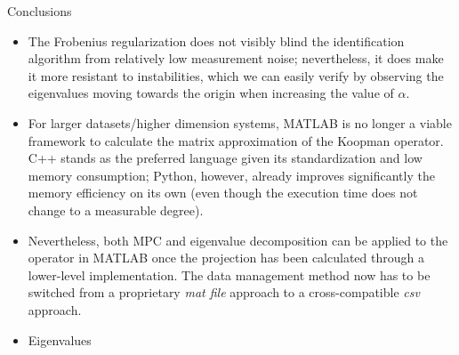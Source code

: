 \documentclass{beamer}
\begin{document}
\begin{frame}[allowframebreaks]{Conclusions}
    \begin{itemize}
        \item The Frobenius regularization does not visibly blind the identification algorithm from relatively low measurement noise; nevertheless, it does make it more resistant to instabilities, which we can easily verify by observing the eigenvalues moving towards the origin when increasing the value of $\alpha$.
        \item For larger datasets/higher dimension systems, MATLAB is no longer a viable framework to calculate the matrix approximation of the Koopman operator. C++ stands as the preferred language given its standardization and low memory consumption; Python, however, already improves significantly the memory efficiency on its own (even though the execution time does not change to a measurable degree).
        \item Nevertheless, both MPC and eigenvalue decomposition can be applied to the operator in MATLAB once the projection has been calculated through a lower-level implementation. The data management method now has to be switched from a proprietary \textit{mat file} approach to a cross-compatible \textit{csv} approach.
        \item Eigenvalues 
    \end{itemize}
\end{frame}
\end{document}
